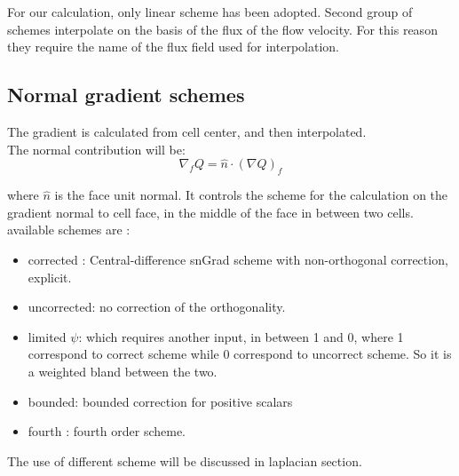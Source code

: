 \documentclass[a4paper,12pt]{article}
\begin{document}

For our calculation, only linear scheme has been adopted. Second group of schemes interpolate on the basis of the flux of the flow velocity. For this reason they require the name of the flux field used for interpolation.


\subsection{Normal gradient schemes}
The gradient is calculated from cell center, and then interpolated. 
\\The normal contribution will be: 
\begin{equation}
\nabla_f Q = \hat{n} \cdot (\nabla Q )_f
\end{equation}

where $\hat{n}$ is the face unit normal. It controls the scheme for the calculation on the gradient normal to cell face, in the middle of the face in between two cells. available schemes are : \\
\begin{itemize} 

 \item {\ttfamily corrected} : Central-difference snGrad scheme with non-orthogonal correction, explicit.
  \item {\ttfamily uncorrected}: no correction of the orthogonality.
 \item {\ttfamily limited $\psi$}: which requires another input, in between 1 and 0, where 1 correspond to correct scheme while 0 correspond to uncorrect scheme. So it is a weighted bland between the two.
 \item {\ttfamily bounded}: bounded correction for positive scalars
 \item {\ttfamily fourth} : fourth order scheme.
\end{itemize} 

The use of different scheme will be discussed in laplacian section.
\end{document}

